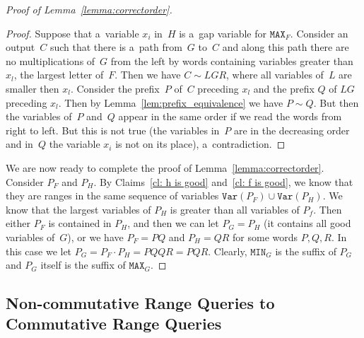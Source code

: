 \documentclass[11pt,letterpaper]{article}
\newcommand{\mmin}{\texttt{MIN}}
\newcommand{\mmax}{\texttt{MAX}}
\newcommand{\var}{\texttt{Var}}
\begin{document}
\begin{proof}[Proof of Lemma~\ref{lemma:correctorder}]
\begin{proof}
Suppose that a~variable $x_i$ in~$H$ is a~gap variable for $\mmax_F$. Consider an output~$C$ such that there is a~path from~$G$ to~$C$ and along this path there are no multiplications of~$G$ from the left by words containing variables greater than $x_l$, the largest letter of~$F$. Then we have $C \sim LGR$, where all variables of~$L$ are smaller then $x_l$. Consider the prefix~$P$ of~$C$ preceding $x_l$ and the prefix $Q$ of $LG$ preceding $x_l$.
Then by Lemma~\ref{lem:prefix_equivalence} we have $P \sim Q$. But then the variables of~$P$ and~$Q$ appear in the same order if we read the words from right to left. But this is not true (the variables in~$P$ are in the decreasing order and in~$Q$ the variable $x_i$ is not on its place), a~contradiction.
\end{proof}

We are now ready to complete the proof of Lemma~\ref{lemma:correctorder}.
Consider $P_F$ and $P_H$. By Claims~\ref{cl: h is good} and~\ref{cl: f is good}, we know that they are ranges in the same sequence of variables $\var(P_F)\cup \var(P_H)$. We know that the largest variables of $P_H$ is greater than all variables of $P_f$. Then either $P_F$ is contained in $P_H$, and then we can let $P_G=P_H$ (it contains all good variables of~$G$), or we have $P_F =PQ$ and $P_H=QR$ for some words $P, Q, R$. In this case we let $P_G = P_F \cdot P_H = PQQR=PQR$. Clearly, $\mmin_G$ is the suffix of $P_G$ and $P_G$ itself is the suffix of $\mmax_G$. 
\end{proof}



\subsection{Non-commutative Range Queries to Commutative Range Queries}
\end{document}
